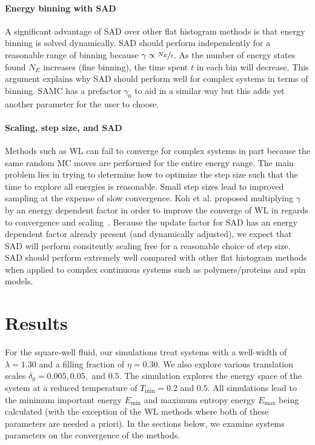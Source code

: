 \documentclass[letterpaper,twocolumn,amsmath,amssymb,pre,aps,10pt]{revtex4-1}
\begin{document}
\paragraph{Energy binning with SAD}

A significant advantage of SAD over other flat histogram methods is
that energy binning is solved dynamically. SAD should perform
independently for a reasonable range of binning because $\gamma \propto
\nicefrac{N_{E}}{t}$.  As the number of energy states found $N_{E}$
increases (fine binning), the time spent $t$ in each bin will decrease.
This argument explains why SAD should perform well for complex systems
in terms of binning. SAMC has a prefactor $\gamma_0$ to aid in a
similar way but this adds yet another parameter for the user to choose.

\paragraph{Scaling, step size, and SAD}
Methods such as WL can fail to converge for complex systems in part
because the same random MC moves are performed for the entire energy
range.  The main problem lies in trying to determine how to optimize
the step size such that the time to explore all energies is reasonable.
Small step sizes lead to improved sampling at the expense of slow
convergence. Koh et al. proposed multiplying $\gamma$ by an energy
dependent factor in order to improve the converge of WL in regards to
convergence and scaling~\cite{koh2013dynamically}.  Because the update
factor for SAD has an energy dependent factor already present (and
dynamically adjusted), we expect that SAD will perform consitently
scaling free for a reasonable choice of step size.  SAD should perform
extremely well compared with other flat histogram methods when applied
to complex continuous systems such as polymers/proteins and spin models.

\section{Results}\label{sec:results}

For the square-well fluid, our simulations treat systems with a
well-width of $\lambda = 1.30$ and a filling fraction of
$\eta = 0.30$. We also explore various translation scales $\delta_0 = 0.005,
0.05,$ and $0.5$. The simulation explores the
energy space of the system at a reduced temperature of
$T_{\text{min}} = 0.2$ and $0.5$.  All simulations lead to the minimum important
energy $E_{\min}$ and maximum entropy energy $E_{\max}$
being calculated (with the exception of the WL methods where both
of these parameters are needed a priori).  In the sections below, we
examine systems parameters on the convergence of the methods.
\end{document}
